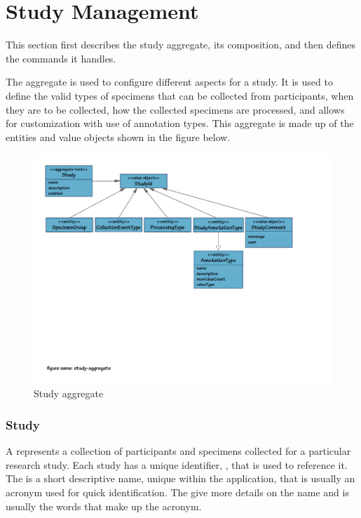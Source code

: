 \chapter{Study Management}

This section first describes the study aggregate, its composition, and then
defines the commands it handles.

The  aggregate is used to configure different aspects for a
study. It is used to define the valid types of specimens that can be collected
from participants, when they are to be collected, how the collected specimens
are processed, and allows for customization with use of annotation types. This
aggregate is made up of the entities and value objects shown in the figure
below.

\begin{figure}[H]
  \centering
  \includegraphics[trim={9mm 85mm 36mm 9mm}, clip,
    width=1\textwidth]{images/study-aggregate}
  \caption{Study aggregate}
  \label{fig:study-aggregate}
\end{figure}

\subsection*{Study}

A  represents a collection of participants and specimens
collected for a particular research study. Each study has a unique identifier,
, that is used to reference it. The  is a short
descriptive name, unique within the application, that is usually an acronym
used for quick identification.  The  give more details on
the name and is usually the words that make up the acronym.

